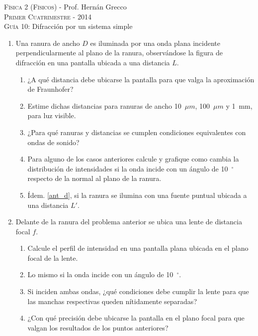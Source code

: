 \documentclass[11pt,spanish,a4paper]{article}
\begin{document}
\begin{center}
	\textsc{\large Física 2 (Físicos)} - Prof. Hernán Grecco\\
	\textsc{\large Primer Cuatrimestre - 2014}\\
	\textsc{\large Guía 10:} Difracción por un sistema simple
\end{center}




\begin{enumerate}

\item Una ranura de ancho \( D \) es iluminada por una onda plana incidente perpendicularmente al plano de la ranura, observándose la figura de difracción en una pantalla ubicada a una distancia \( L \).
	\begin{enumerate}
		\item ¿A qué distancia debe ubicarse la pantalla para que valga la aproximación de Fraunhofer?
		\item Estime dichas distancias para ranuras de ancho \SI{10}{\( \mu m \)}, \SI{100}{\( \mu m \)} y \SI{1}{mm}, para luz visible.
		\item ¿Para qué ranuras y distancias se cumplen condiciones equivalentes con ondas de sonido?
		\item \label{ant_d} Para alguno de los casos anteriores calcule y grafique como cambia la distribución de intensidades si la onda incide con un ángulo de \SI{10}{\(^\circ\)} respecto de la normal al plano de la ranura.
		\item Ídem. \ref{ant_d}, si la ranura se ilumina con una fuente puntual ubicada a una distancia \( L' \).
	\end{enumerate}
	

\item Delante de la ranura del problema anterior se ubica una lente de distancia focal \( f \).
	\begin{enumerate}
		\item Calcule el perfil de intensidad en una pantalla plana ubicada en el plano focal de la	lente.
		\item Lo mismo si la onda incide con un ángulo de \SI{10}{\(^\circ\)}.
		\item Si inciden ambas ondas, ¿qué condiciones debe cumplir la lente para que las manchas respectivas queden nítidamente separadas?
		\item ¿Con qué precisión debe ubicarse la pantalla en el plano focal para que valgan los resultados de los puntos anteriores?
	\end{enumerate}



\end{enumerate}
\end{document}
